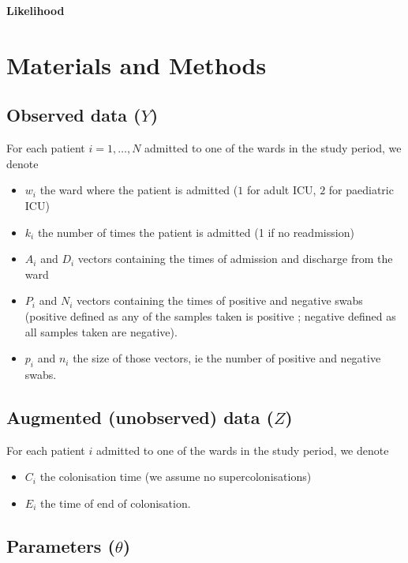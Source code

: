\documentclass[10pt]{article}
\begin{document}
\begin{flushleft}
{\Large
\textbf{Likelihood}
}
\\
\section*{Materials and Methods}

\subsection*{Observed data ($Y$)}

For each patient $i=1,\ldots,N$ admitted to one of the wards in the study period, we denote 
\begin{itemize}
	\item $w_i$ the ward where the patient is admitted ($1$ for adult ICU, $2$ for paediatric ICU)
	\item $k_i$ the number of times the patient is admitted (1 if no readmission)
	\item $A_i$ and $D_i$ vectors containing the times of admission and discharge from the ward
	\item $P_i$ and $N_i$ vectors containing the times of positive and negative swabs (positive defined as any of the samples taken is positive ; negative defined as all samples taken are negative).
	\item $p_i$ and $n_i$ the size of those vectors, ie the number of positive and negative swabs.
\end{itemize}

\subsection*{Augmented (unobserved) data ($Z$)}

For each patient $i$ admitted to one of the wards in the study period, we denote 
\begin{itemize}
	\item $C_i$ the colonisation time (we assume no supercolonisations)
	\item $E_i$ the time of end of colonisation.
\end{itemize}

\subsection*{Parameters ($\theta$)}


\end{flushleft}
\end{document}
